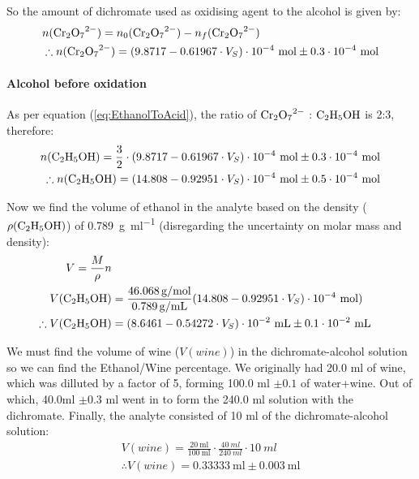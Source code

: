 So the amount of dichromate used as oxidising agent to the alcohol is given by:
\begin{equation}
\begin{split}
	&n(\ce{Cr2O7^{2-}}) = n_0(\ce{Cr2O7^{2-}}) - n_f(\ce{Cr2O7^{2-}}) \\
	&\therefore n(\ce{Cr2O7^{2-}}) = (9.8717 - 0.61967 \cdot V_{S}) \cdot 10^{-4} \ \si{\mole} \pm 0.3 \cdot 10^{-4} \ \si{\mole}
\end{split}
\end{equation}

\paragraph{Alcohol before oxidation}
As per equation (\ref{eq:EthanolToAcid}), the ratio of $\ce{Cr2O7^{2-}}$ : $ \ce{C2H5OH} $ is 2:3, therefore:
\begin{equation}
\begin{split}
	n(\ce{C2H5OH}) = \frac{3}{2} \cdot (9.8717 - 0.61967 \cdot V_{S}) \cdot 10^{-4} \ \si{\mole} \pm 0.3 \cdot 10^{-4} \ \si{\mole} \\
	\therefore n(\ce{C2H5OH}) = (14.808 - 0.92951 \cdot V_{S}) \cdot 10^{-4} \ \si{\mole} \pm 0.5 \cdot 10^{-4} \ \si{\mole}
\end{split}
\end{equation}

Now we find the volume of ethanol in the analyte based on the density ($\rho(\ce{C2H5OH})$) of \SI{0.789}{g\per\ml} (disregarding the uncertainty on molar mass and density):
\begin{equation}
\begin{split}
	V = \frac{M}{\rho}n\\
	V(\ce{C2H5OH}) &= \frac{\SI{46.068}{g\per\mole}}{\SI{0.789}{g\per\ml}} (14.808 - 0.92951 \cdot V_{S}) \cdot 10^{-4} \ \si{\mole})\\
	\therefore V(\ce{C2H5OH}) &= (8.6461 - 0.54272 \cdot V_{S}) \cdot 10^{-2} \ \si{\milli\litre} \pm 0.1 \cdot 10^{-2} \ \si{\milli\litre}
\end{split}
\end{equation}

We must find the volume of wine ($V(wine)$) in the dichromate-alcohol solution so we can find the Ethanol/Wine percentage. We originally had 20.0 ml of wine, which was dilluted by a factor of 5, forming 100.0 ml $ \pm 0.1$ of water+wine. Out of which, 40.0ml $\pm 0.3$ ml went in to form the 240.0 ml solution with the dichromate. Finally, the analyte consisted of 10 ml of the dichromate-alcohol solution:
\begin{equation}
\begin{split}
	V(wine) = \frac{\SI{20}{\ml}}{\SI{100}{\ml}} \cdot \frac{\SI{40}{ml}}{\SI{240}{ml}} \cdot \SI{10}{ml} \\
	\therefore V(wine) = \SI{0.33333}{\milli\litre} \pm \SI{0.003}{\milli\litre}
\end{split}
\end{equation}

